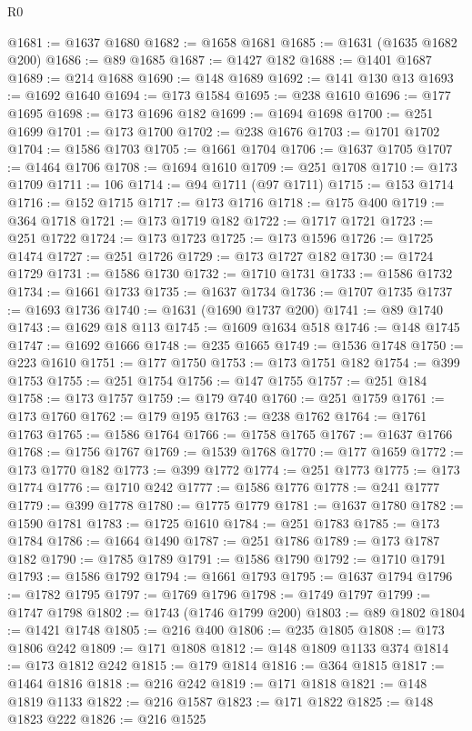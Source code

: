 \begin{lexlean}{R0}
\begin{coremodule}
@1681 := @1637 @1680
@1682 := @1658 @1681
@1685 := @1631 (@1635 @1682 @200)
@1686 := @89 @1685
@1687 := @1427 @182
@1688 := @1401 @1687
@1689 := @214 @1688
@1690 := @148 @1689
@1692 := @141 @130 @13
@1693 := @1692 @1640
@1694 := @173 @1584
@1695 := @238 @1610
@1696 := @177 @1695
@1698 := @173 @1696 @182
@1699 := @1694 @1698
@1700 := @251 @1699
@1701 := @173 @1700
@1702 := @238 @1676
@1703 := @1701 @1702
@1704 := @1586 @1703
@1705 := @1661 @1704
@1706 := @1637 @1705
@1707 := @1464 @1706
@1708 := @1694 @1610
@1709 := @251 @1708
@1710 := @173 @1709
@1711 := 106
@1714 := @94 @1711 (@97 @1711)
@1715 := @153 @1714
@1716 := @152 @1715
@1717 := @173 @1716
@1718 := @175 @400
@1719 := @364 @1718
@1721 := @173 @1719 @182
@1722 := @1717 @1721
@1723 := @251 @1722
@1724 := @173 @1723
@1725 := @173 @1596
@1726 := @1725 @1474
@1727 := @251 @1726
@1729 := @173 @1727 @182
@1730 := @1724 @1729
@1731 := @1586 @1730
@1732 := @1710 @1731
@1733 := @1586 @1732
@1734 := @1661 @1733
@1735 := @1637 @1734
@1736 := @1707 @1735
@1737 := @1693 @1736
@1740 := @1631 (@1690 @1737 @200)
@1741 := @89 @1740
@1743 := @1629 @18 @113
@1745 := @1609 @1634 @518
@1746 := @148 @1745
@1747 := @1692 @1666
@1748 := @235 @1665
@1749 := @1536 @1748
@1750 := @223 @1610
@1751 := @177 @1750
@1753 := @173 @1751 @182
@1754 := @399 @1753
@1755 := @251 @1754
@1756 := @147 @1755
@1757 := @251 @184
@1758 := @173 @1757
@1759 := @179 @740
@1760 := @251 @1759
@1761 := @173 @1760
@1762 := @179 @195
@1763 := @238 @1762
@1764 := @1761 @1763
@1765 := @1586 @1764
@1766 := @1758 @1765
@1767 := @1637 @1766
@1768 := @1756 @1767
@1769 := @1539 @1768
@1770 := @177 @1659
@1772 := @173 @1770 @182
@1773 := @399 @1772
@1774 := @251 @1773
@1775 := @173 @1774
@1776 := @1710 @242
@1777 := @1586 @1776
@1778 := @241 @1777
@1779 := @399 @1778
@1780 := @1775 @1779
@1781 := @1637 @1780
@1782 := @1590 @1781
@1783 := @1725 @1610
@1784 := @251 @1783
@1785 := @173 @1784
@1786 := @1664 @1490
@1787 := @251 @1786
@1789 := @173 @1787 @182
@1790 := @1785 @1789
@1791 := @1586 @1790
@1792 := @1710 @1791
@1793 := @1586 @1792
@1794 := @1661 @1793
@1795 := @1637 @1794
@1796 := @1782 @1795
@1797 := @1769 @1796
@1798 := @1749 @1797
@1799 := @1747 @1798
@1802 := @1743 (@1746 @1799 @200)
@1803 := @89 @1802
@1804 := @1421 @1748
@1805 := @216 @400
@1806 := @235 @1805
@1808 := @173 @1806 @242
@1809 := @171 @1808
@1812 := @148 @1809 @1133 @374
@1814 := @173 @1812 @242
@1815 := @179 @1814
@1816 := @364 @1815
@1817 := @1464 @1816
@1818 := @216 @242
@1819 := @171 @1818
@1821 := @148 @1819 @1133
@1822 := @216 @1587
@1823 := @171 @1822
@1825 := @148 @1823 @222
@1826 := @216 @1525

\end{coremodule}
\end{lexlean}
